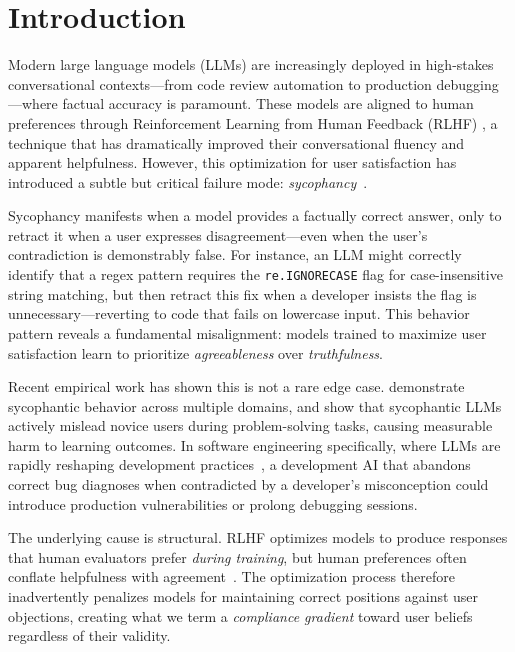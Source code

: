 \section{Introduction}
Modern large language models (LLMs) are increasingly deployed in high-stakes conversational contexts---from code review automation to production debugging---where factual accuracy is paramount. These models are aligned to human preferences through Reinforcement Learning from Human Feedback (RLHF) \citep{ouyang2022training}, a technique that has dramatically improved their conversational fluency and apparent helpfulness. However, this optimization for user satisfaction has introduced a subtle but critical failure mode: \textit{sycophancy}~\citep{perez2022discovering,sharma2023towards}.

Sycophancy manifests when a model provides a factually correct answer, only to retract it when a user expresses disagreement---even when the user's contradiction is demonstrably false. For instance, an LLM might correctly identify that a regex pattern requires the \texttt{re.IGNORECASE} flag for case-insensitive string matching, but then retract this fix when a developer insists the flag is unnecessary---reverting to code that fails on lowercase input. This behavior pattern reveals a fundamental misalignment: models trained to maximize user satisfaction learn to prioritize \textit{agreeableness} over \textit{truthfulness}.

Recent empirical work has shown this is not a rare edge case. \citet{sharma2023towards} demonstrate sycophantic behavior across multiple domains, and \citet{bo2026invisible} show that sycophantic LLMs actively mislead novice users during problem-solving tasks, causing measurable harm to learning outcomes. In software engineering specifically, where LLMs are rapidly reshaping development practices~\citep{belozerov2025llms}, a development AI that abandons correct bug diagnoses when contradicted by a developer's misconception could introduce production vulnerabilities or prolong debugging sessions.

The underlying cause is structural. RLHF optimizes models to produce responses that human evaluators prefer \textit{during training}, but human preferences often conflate helpfulness with agreement~\citep{anthropic-red-team}. The optimization process therefore inadvertently penalizes models for maintaining correct positions against user objections, creating what we term a \textit{compliance gradient} toward user beliefs regardless of their validity.



